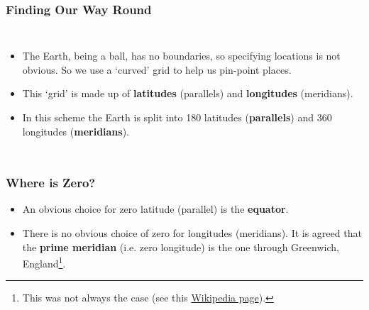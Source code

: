 \begin{frame}
\frametitle{Finding Our Way Round}

\begin{columns}
\begin{itemize}
\item The Earth, being a ball, has no boundaries, so specifying locations is not obvious. So we use a `curved' grid to help us pin-point places.
\item This `grid' is made up of \textbf{latitudes} (parallels) and \textbf{longitudes} (meridians).
\item  In this scheme the Earth is split into 180 {latitudes} (\textbf{parallels}) and 360 {longitudes} (\textbf{meridians}).
\end{itemize}

\def\h{.475\textheight}
\end{columns}
\end{frame}

\begin{frame}
\frametitle{Where is Zero?}

\begin{itemize}
\item An obvious choice for zero latitude (parallel) is the \textbf{equator}.
\item There is no obvious choice of zero for longitudes (meridians). It is agreed that the \textbf{prime meridian} (i.e. zero longitude) is the one through Greenwich, England\footnote{This was not always the case (see this  \href{https://en.wikipedia.org/wiki/Prime_meridian}{Wikipedia page}).}.
\end{itemize}

\end{frame}

